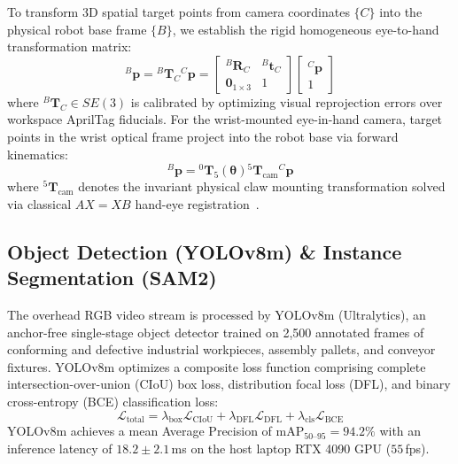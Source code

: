 \documentclass[journal]{IEEEtran}
\begin{document}
To transform 3D spatial target points from camera coordinates $\{C\}$ into the physical robot base frame $\{B\}$, we establish the rigid homogeneous eye-to-hand transformation matrix:
\begin{equation}
\label{eq:hand_eye_transform}
{}^B\mathbf{p} = {}^B\mathbf{T}_C {}^C\mathbf{p} = \begin{bmatrix} {}^B\mathbf{R}_C & {}^B\mathbf{t}_C \\ \mathbf{0}_{1 \times 3} & 1 \end{bmatrix} \begin{bmatrix} {}^C\mathbf{p} \\ 1 \end{bmatrix}
\end{equation}
where ${}^B\mathbf{T}_C \in SE(3)$ is calibrated by optimizing visual reprojection errors over workspace AprilTag fiducials. For the wrist-mounted eye-in-hand camera, target points in the wrist optical frame project into the robot base via forward kinematics:
\begin{equation}
\label{eq:eye_in_hand_transform}
{}^B\mathbf{p} = {}^0\mathbf{T}_5(\boldsymbol{\theta}) {}^5\mathbf{T}_{\text{cam}} {}^C\mathbf{p}
\end{equation}
where ${}^5\mathbf{T}_{\text{cam}}$ denotes the invariant physical claw mounting transformation solved via classical $AX=XB$ hand-eye registration~\cite{chaumette2006visual}.

\subsection{Object Detection (YOLOv8m) \& Instance Segmentation (SAM2)}
The overhead RGB video stream is processed by YOLOv8m (Ultralytics), an anchor-free single-stage object detector trained on 2,500 annotated frames of conforming and defective industrial workpieces, assembly pallets, and conveyor fixtures. YOLOv8m optimizes a composite loss function comprising complete intersection-over-union (CIoU) box loss, distribution focal loss (DFL), and binary cross-entropy (BCE) classification loss:
\begin{equation}
\mathcal{L}_{\text{total}} = \lambda_{\text{box}} \mathcal{L}_{\text{CIoU}} + \lambda_{\text{DFL}} \mathcal{L}_{\text{DFL}} + \lambda_{\text{cls}} \mathcal{L}_{\text{BCE}}
\end{equation}
YOLOv8m achieves a mean Average Precision of $\text{mAP}_{50\text{--}95} = 94.2\%$ with an inference latency of $18.2 \pm 2.1$\,ms on the host laptop RTX 4090 GPU ($55$\,fps).
\end{document}
